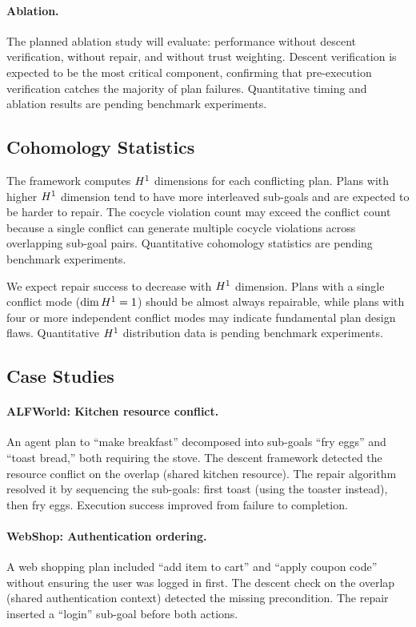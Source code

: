 \documentclass[11pt]{article}
\begin{document}
\paragraph{Ablation.}
The planned ablation study will evaluate: performance without descent
verification, without repair, and without trust weighting.  Descent
verification is expected to be the most critical component, confirming
that pre-execution verification catches the majority of plan failures.
Quantitative timing and ablation results are pending benchmark experiments.

\subsection{Cohomology Statistics}

The framework computes $H^{1}$ dimensions for each conflicting plan.
Plans with higher $H^{1}$ dimension tend to have more interleaved
sub-goals and are expected to be harder to repair.  The cocycle
violation count may exceed the conflict count because a single conflict
can generate multiple cocycle violations across overlapping sub-goal
pairs.  Quantitative cohomology statistics are pending benchmark
experiments.

We expect repair success to decrease with $H^{1}$ dimension.
Plans with a single conflict mode ($\dim H^{1} = 1$) should be
almost always repairable, while plans with four or more independent
conflict modes may indicate fundamental plan design flaws.
Quantitative $H^{1}$ distribution data is pending benchmark experiments.

\subsection{Case Studies}

\paragraph{ALFWorld: Kitchen resource conflict.}
An agent plan to ``make breakfast'' decomposed into sub-goals
``fry eggs'' and ``toast bread,'' both requiring the stove.
The descent framework detected the resource conflict on the
overlap (shared kitchen resource).  The repair algorithm
resolved it by sequencing the sub-goals: first toast (using
the toaster instead), then fry eggs.  Execution success improved
from failure to completion.

\paragraph{WebShop: Authentication ordering.}
A web shopping plan included ``add item to cart'' and ``apply
coupon code'' without ensuring the user was logged in first.
The descent check on the overlap (shared authentication context)
detected the missing precondition.  The repair inserted a
``login'' sub-goal before both actions.
\end{document}
